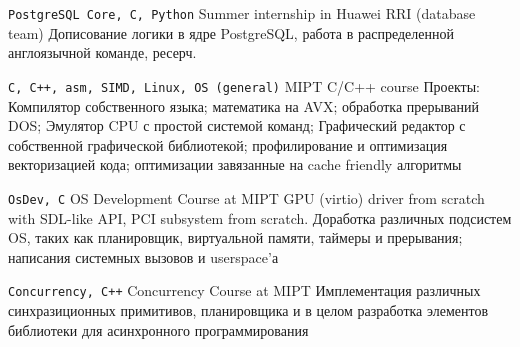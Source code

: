 \documentclass[9pt]{developercv} %
\begin{document}


\begin{entrylist}
	\entry
	{\texttt{PostgreSQL Core, C, Python}}
	{Summer internship in Huawei RRI (database team)}
	{}
	{Дописование логики в ядре PostgreSQL, работа в распределенной англоязычной команде, ресерч.}
 
	\entry
        {\texttt{C, C++, asm, SIMD, Linux, OS (general)}}
		{MIPT C/C++ course}
		{}
		{Проекты: Компилятор собственного языка; математика на AVX; обработка прерываний DOS; Эмулятор CPU с простой системой команд; Графический редактор с собственной графической библиотекой; профилирование и оптимизация векторизацией кода; оптимизации завязанные на cache friendly алгоритмы}

        \entry
        {\texttt{OsDev, C}}
        {OS Development Course at MIPT}
        {}
        {GPU (virtio) driver from scratch with SDL-like API, PCI subsystem from scratch. Доработка различных подсистем OS, таких как планировщик, виртуальной памяти, таймеры и прерывания; написания системных вызовов и userspace'а}

        \entry
        {\texttt{Concurrency, C++}}
        {Concurrency Course at MIPT}
        {}
        {Имплементация различных синхразиционных примитивов, планировщика и в целом разработка элементов библиотеки для асинхронного программирования}
\end{entrylist}

\end{document}
